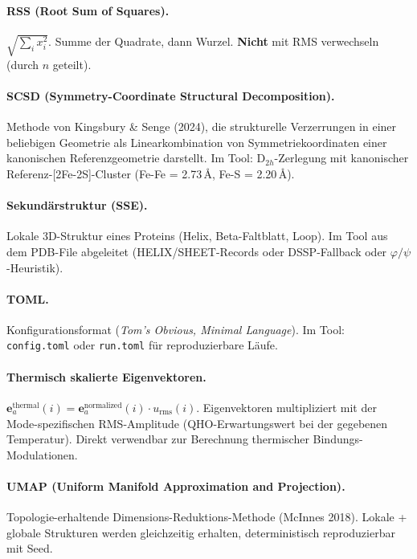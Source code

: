 \documentclass[11pt,a4paper,twoside]{article}
\providecommand{\angstrom}{\text{\AA}}    %
\theoremstyle{remark}
\begin{document}
\paragraph{RSS (Root Sum of Squares).}
$\sqrt{\sum_i x_i^2}$. Summe der Quadrate, dann Wurzel.
\textbf{Nicht} mit RMS verwechseln (durch $n$ geteilt).

\paragraph{SCSD (Symmetry-Coordinate Structural Decomposition).}
Methode von Kingsbury \& Senge (2024), die strukturelle
Verzerrungen in einer beliebigen Geometrie als Linearkombination
von Symmetriekoordinaten einer kanonischen Referenzgeometrie
darstellt. Im Tool: D$_{2h}$-Zerlegung mit kanonischer
Referenz-[2Fe-2S]-Cluster (Fe-Fe = 2.73\,$\angstrom$,
Fe-S = 2.20\,$\angstrom$).

\paragraph{Sekund\"arstruktur (SSE).}
Lokale 3D-Struktur eines Proteins (Helix, Beta-Faltblatt, Loop).
Im Tool aus dem PDB-File abgeleitet (HELIX/SHEET-Records oder
DSSP-Fallback oder $\varphi/\psi$-Heuristik).

\paragraph{TOML.}
Konfigurationsformat (\emph{Tom's Obvious, Minimal Language}).
Im Tool: \texttt{config.toml} oder \texttt{run.toml} f\"ur
reproduzierbare L\"aufe.

\paragraph{Thermisch skalierte Eigenvektoren.}
$\mathbf{e}_a^\text{thermal}(i) = \mathbf{e}_a^\text{normalized}(i)
\cdot u_\text{rms}(i)$. Eigenvektoren multipliziert mit der
Mode-spezifischen RMS-Amplitude (QHO-Erwartungswert bei der
gegebenen Temperatur). Direkt verwendbar zur Berechnung
thermischer Bindungs-Modulationen.

\paragraph{UMAP (Uniform Manifold Approximation and Projection).}
Topologie-erhaltende Dimensions-Reduktions-Methode (McInnes 2018).
Lokale + globale Strukturen werden gleichzeitig erhalten,
deterministisch reproduzierbar mit Seed.
\end{document}
